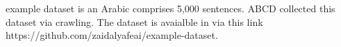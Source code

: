 example dataset is an Arabic comprises 5,000 sentences.
ABCD collected this dataset via crawling. 
The dataset is avaialble in via this link https://github.com/zaidalyafeai/example-dataset.